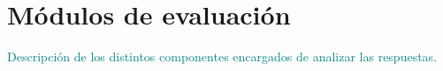 \section{Módulos de evaluación}
\textcolor{teal}{Descripción de los distintos componentes encargados de analizar las respuestas.}
